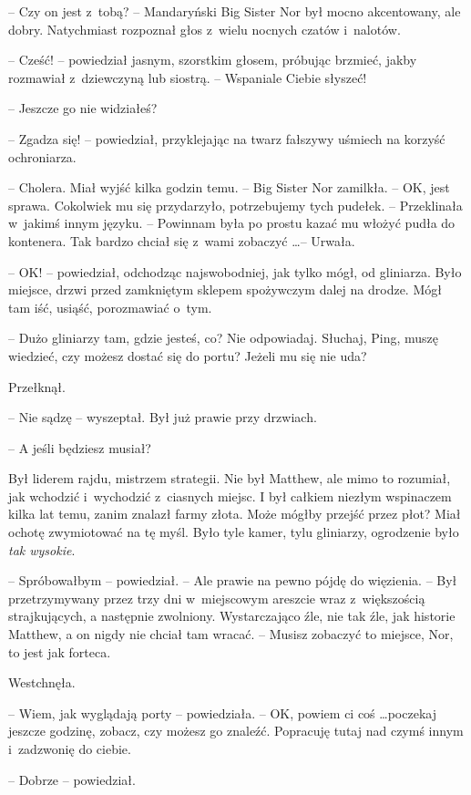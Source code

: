 \documentclass[oneside,polish,11pt,rmheadings]{mwbk}
\begin{document}
-- Czy on jest z~tobą? -- Mandaryński Big Sister Nor był mocno akcentowany, ale dobry. Natychmiast rozpoznał głos z~wielu nocnych czatów i~nalotów.

-- Cześć! -- powiedział jasnym, szorstkim głosem, próbując brzmieć, jakby rozmawiał z~dziewczyną lub siostrą. -- Wspaniale Ciebie słyszeć! 

-- Jeszcze go nie widziałeś?

-- Zgadza się! -- powiedział, przyklejając na twarz fałszywy uśmiech na korzyść ochroniarza.

-- Cholera. Miał wyjść kilka godzin temu. -- Big Sister Nor zamilkła. -- OK, jest sprawa. Cokolwiek mu się przydarzyło, potrzebujemy tych pudełek. -- Przeklinała w~jakimś innym języku. -- Powinnam była po prostu kazać mu włożyć pudła do kontenera. Tak bardzo chciał się z~wami zobaczyć \ldots  -- Urwała.

-- OK! -- powiedział, odchodząc najswobodniej, jak tylko mógł, od gliniarza. Było miejsce, drzwi przed zamkniętym sklepem spożywczym dalej na drodze. Mógł tam iść, usiąść, porozmawiać o~tym.

-- Dużo gliniarzy tam, gdzie jesteś, co? Nie odpowiadaj. Słuchaj, Ping, muszę wiedzieć, czy możesz dostać się do portu? Jeżeli mu się nie uda?

Przełknął. 

-- Nie sądzę -- wyszeptał. Był już prawie przy drzwiach.

-- A jeśli będziesz musiał?

Był liderem rajdu, mistrzem strategii. Nie był Matthew, ale mimo to rozumiał, jak wchodzić i~wychodzić z~ciasnych miejsc. I był całkiem niezłym wspinaczem kilka lat temu, zanim znalazł farmy złota. Może mógłby przejść przez płot? Miał ochotę zwymiotować na tę myśl. Było tyle kamer, tylu gliniarzy, ogrodzenie było \textit{tak wysokie}.

-- Spróbowałbym -- powiedział. -- Ale prawie na pewno pójdę do więzienia. -- Był przetrzymywany przez trzy dni w~miejscowym areszcie wraz z~większością strajkujących, a następnie zwolniony. Wystarczająco źle, nie tak źle, jak historie Matthew, a on nigdy nie chciał tam wracać. -- Musisz zobaczyć to miejsce, Nor, to jest jak forteca. 

Westchnęła. 

-- Wiem, jak wyglądają porty -- powiedziała. -- OK, powiem ci coś \ldots  poczekaj jeszcze godzinę, zobacz, czy możesz go znaleźć. Popracuję tutaj nad czymś innym i~zadzwonię do ciebie. 

-- Dobrze -- powiedział.
\end{document}
